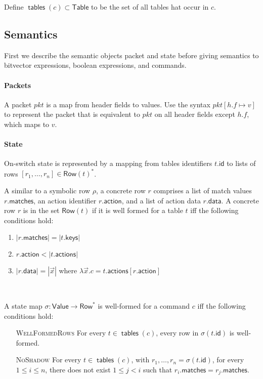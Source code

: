 \documentclass{article}
\newcommand{\pkt}{\mathit{pkt}}
\newcommand{\Value}{\mathsf{Value}}
\newcommand{\Table}{\mathsf{Table}}
\newcommand{\Row}{\mathsf{Row}}
\newcommand{\matches}{\mathsf{matches}}
\newcommand{\action}{\mathsf{action}}
\newcommand{\actions}{\mathsf{actions}}
\newcommand{\keys}{\mathsf{keys}}
\newcommand{\data}{\mathsf{data}}
\newcommand{\id}{\mathsf{id}}
\newcommand{\tables}{\mathop{\mathsf{tables}}}
\begin{document}
Define $\tables(c) \subset \Table$ to be the set of all tables hat occur in $c$.

\subsection{Semantics}

First we describe the semantic objects packet and state before giving semantics
to bitvector expressions, boolean expressions, and commands.

\paragraph{Packets}
A packet $\pkt$ is a map from header fields to values. Use the syntax $\pkt[h.f
  \mapsto v]$ to represent the packet that is equivalent to $\pkt$ on all header
fields except $h.f$, which maps to $v$.

\paragraph{State}
On-switch state is represented by a mapping from tables identifiers $t.\id$ to
lists of rows $[r_1,\ldots,r_n] \in \Row(t)^*$.

A similar to a symbolic row $\rho$, a concrete row $r$ comprises a list of match
values $r.\matches$, an action identifier $r.\action$, and a list of action data
$r.\data$. A concrete row $r$ is in the set $\Row(t)$ if it is well formed for a
table $t$ iff the following conditions hold:
\begin{enumerate}
\item $|r.\matches| = |t.\keys|$
\item $r.\action < |t.\actions|$
\item $|r.\data| = |\vec x|$ where $\lambda \vec x. c = t.\actions[r.\action]$
\end{enumerate}\

A state map $\sigma : \Value \to \Row^*$ is well-formed for a command $c$ iff the
following conditions hold:
\begin{enumerate}
\item[\textsc{WellFormedRows}] For every $t\in \tables(c)$, every row in $\sigma(t.\id)$ is well-formed.
\item[\textsc{NoShadow}] For every $t \in \tables(c)$, with $r_1,\ldots,r_n =
  \sigma(t.\id)$, for every $1 \leq i \leq n$, there does not exist $1 \leq j <
  i$ such that $r_i.\matches = r_j.\matches$.
\end{enumerate}
\end{document}
